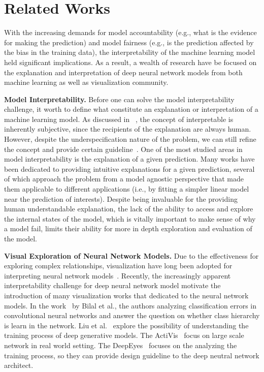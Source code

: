 
\section{Related Works}
With the increasing demands for model accountability (e.g., what is the evidence for making the prediction) and model fairness (e.g., is the prediction affected by the bias in the training data),
the interpretability of the machine learning model held significant implications. As a result, a wealth of research have be focused on the explanation and interpretation of deep neural network models from both machine learning as well as visualization community.

\textbf{Model Interpretability.}
Before one can solve the model interpretability challenge, it worth to define what constitute an explanation or interpretation of a machine learning model.
As discussed in ~\cite{Lipton2016, Doshi-Velez2017}, the concept of interpretable is inherently subjective, since the recipients of the explanation are always human.
However, despite the underspecification nature of the problem, we can still refine the concept and provide certain guideline~\cite{Doshi-Velez2017}.
%
One of the most studied areas in model interpretability is the explanation of a given prediction.
Many works have been dedicated to providing intuitive explanations for a given prediction, several~\cite{RibeiroSinghGuestrin2016, KrausePererNg2016} of which approach the problem from a model agnostic perspective that made them applicable to different applications (i.e., by fitting a simpler linear model near the prediction of interests).
%
Despite being invaluable for the providing human understandable explanation, the lack of the ability to access and explore the internal states of the model, which is vitally important to make sense of why a model fail, limits their ability for more in depth exploration and evaluation of the model.

\textbf{Visual Exploration of Neural Network Models.}
Due to the effectiveness for exploring complex relationships, visualization have long been adopted for interpreting neural network models~\cite{TzengMa2005}.
Recently, the increasingly apparent interpretability challenge for deep neural network model motivate the introduction of many visualization works that dedicated to the neural network models.
In the work~\cite{BilalJourablooYe2018} by Bilal et al., the authors analyzing classification errors in convolutional neural networks and answer the question on whether class hierarchy is learn in the network.
Liu et al.~\cite{LiuShiCao2018} explore the possibility of understanding the training process of deep generative models.
The ActiVis~\cite{KahngAndrewsKalro2018} focus on large scale network in real world setting.
The DeepEyes~\cite{Pezzotti2018} focuses on the analyzing the training process, so they can provide design guideline to the deep neutral network architect.

